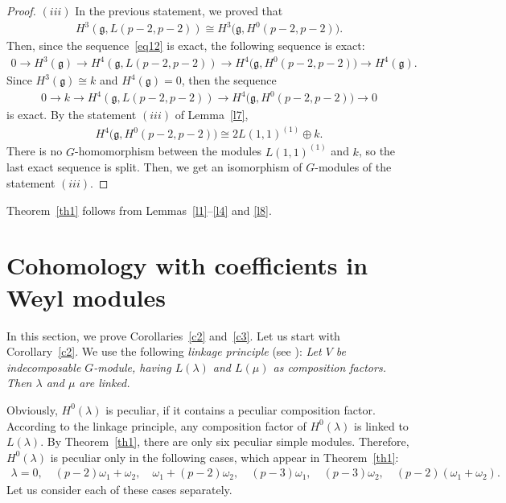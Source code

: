 \documentclass[10pt,a4paper]{amsart}
\numberwithin{equation}{section}
\begin{document}
\begin{proof}
 $(iii)$ In the previous statement, we proved that
\begin{gather*}
H^3(\mathfrak{g},L(p-2,p-2))\cong H^3\big(\mathfrak{g},H^0(p-2,p-2)\big).
\end{gather*}
Then, since the sequence~\eqref{eq12} is exact, the following sequence is exact:
\begin{gather*}
0\longrightarrow H^3(\mathfrak{g})\longrightarrow H^4(\mathfrak{g},L(p-2,p-2))\longrightarrow H^4\big(\mathfrak{g},H^0(p-2,p-2)\big)\longrightarrow H^4(\mathfrak{g}).
\end{gather*}
Since $H^3(\mathfrak{g})\cong k$ and $H^4(\mathfrak{g})=0$, then the sequence
\begin{gather*}
0\longrightarrow k\longrightarrow H^4(\mathfrak{g},L(p-2,p-2))\longrightarrow H^4\big(\mathfrak{g},H^0(p-2,p-2)\big)\longrightarrow 0
\end{gather*}
is exact. By the statement $(iii)$ of Lemma~\ref{l7},
\begin{gather*}
H^4\big(\mathfrak{g},H^0(p-2,p-2)\big)\cong 2L(1,1)^{(1)}\oplus k.
\end{gather*}
There is no $G$-homomorphism between the modules $L(1,1)^{(1)}$ and $k$, so the last exact sequence is split. Then, we get an isomorphism of $G$-modules of the statement $(iii)$.
\end{proof}

Theorem~\ref{th1} follows from Lemmas~\ref{l1}--\ref{l4} and \ref{l8}.


\section{Cohomology with coefficients in Weyl modules}

In this section, we prove Corollaries~\ref{c2} and~\ref{c3}.
Let us start with Corollary~\ref{c2}. We use the following {\it linkage principle} (see \cite[p.~264]{Humph80}):
{\it Let $V$ be indecomposable $G$-module, having $L(\lambda)$ and $L(\mu)$ as composition factors. Then $\lambda$ and $\mu$ are linked.}

Obviously, $H^0(\lambda)$ is peculiar, if it contains a peculiar composition factor.
According to the linkage principle, any composition factor of $H^0(\lambda)$ is linked to $L(\lambda)$. By Theorem~\ref{th1}, there are only six peculiar simple modules. Therefore, $H^0(\lambda)$ is peculiar only in the following cases, which appear in Theorem~\ref{th1}:
\begin{gather*}
\lambda=0,\quad
(p-2)\omega_1+\omega_2,\quad
\omega_1+(p-2)\omega_2,\quad
(p-3)\omega_1,\quad
(p-3)\omega_2,\quad
(p-2)(\omega_1+\omega_2).
\end{gather*}
Let us consider each of these cases separately.
\end{document}
